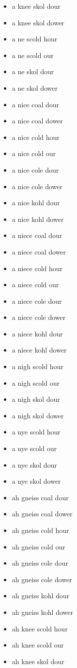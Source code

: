 \begin{itemize}
\item a knee skol dour
\item a knee skol dower
\item a ne scold hour
\item a ne scold our
\item a ne skol dour
\item a ne skol dower
\item a nice coal dour
\item a nice coal dower
\item a nice cold hour
\item a nice cold our
\item a nice cole dour
\item a nice cole dower
\item a nice kohl dour
\item a nice kohl dower
\item a niece coal dour
\item a niece coal dower
\item a niece cold hour
\item a niece cold our
\item a niece cole dour
\item a niece cole dower
\item a niece kohl dour
\item a niece kohl dower
\item a nigh scold hour
\item a nigh scold our
\item a nigh skol dour
\item a nigh skol dower
\item a nye scold hour
\item a nye scold our
\item a nye skol dour
\item a nye skol dower
\item ah gneiss coal dour
\item ah gneiss coal dower
\item ah gneiss cold hour
\item ah gneiss cold our
\item ah gneiss cole dour
\item ah gneiss cole dower
\item ah gneiss kohl dour
\item ah gneiss kohl dower
\item ah knee scold hour
\item ah knee scold our
\item ah knee skol dour

\end{itemize}
